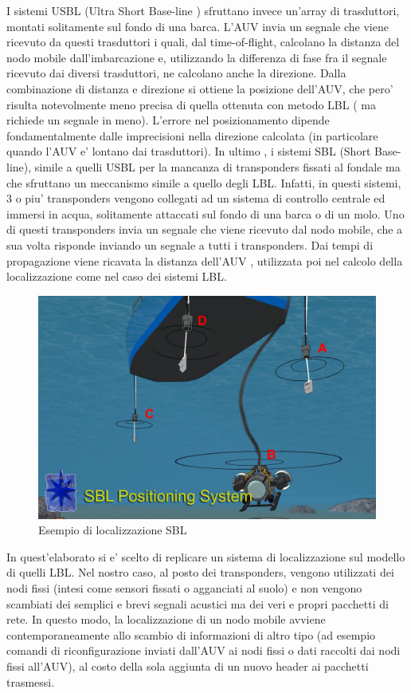 \documentclass[Lau,binding=0.6cm]{sapthesis}
\begin{document}
I sistemi USBL (Ultra Short Base-line ) sfruttano invece un'array di trasduttori, montati solitamente sul fondo di una barca. L'AUV invia un segnale che viene ricevuto da questi trasduttori i quali, dal time-of-flight, calcolano la distanza del nodo mobile dall'imbarcazione e, utilizzando la differenza di fase fra il segnale ricevuto dai diversi trasduttori, ne calcolano anche la direzione. Dalla combinazione di distanza e direzione si ottiene la posizione dell'AUV, che pero' risulta notevolmente meno precisa di quella ottenuta con metodo LBL ( ma richiede un segnale in meno). L'errore nel posizionamento dipende fondamentalmente dalle imprecisioni nella direzione calcolata (in particolare quando l'AUV e' lontano dai trasduttori).\newline
In ultimo , i sistemi SBL (Short Base-line), simile a quelli USBL per la mancanza di transponders fissati al fondale ma che sfruttano un meccanismo simile a quello degli LBL. Infatti, in questi sistemi, 3 o piu' transponders vengono collegati ad un sistema di controllo centrale ed immersi in acqua, solitamente attaccati sul fondo di una barca o di un molo. Uno di questi transponders invia un segnale che viene ricevuto dal nodo mobile, che a sua volta risponde inviando un segnale a tutti i transponders. Dai tempi di propagazione viene ricavata la distanza dell'AUV , utilizzata poi nel calcolo della localizzazione come nel caso dei sistemi LBL.

\begin{figure}[H]
	\centering
	\includegraphics[scale=0.25]{SBL.jpg}
	\caption{ Esempio di localizzazione SBL}
	\label{fig:SBL}
\end{figure}


\par
In quest'elaborato si e' scelto di replicare un sistema di localizzazione sul modello di quelli LBL. Nel nostro caso, al posto dei transponders, vengono utilizzati dei nodi fissi (intesi come sensori fissati o agganciati al suolo) e non vengono scambiati dei semplici e brevi segnali acustici ma dei veri e propri pacchetti di rete. In questo modo, la localizzazione di un nodo mobile avviene contemporaneamente allo scambio di informazioni di altro tipo (ad esempio comandi di riconfigurazione inviati dall'AUV ai nodi fissi o dati raccolti dai nodi fissi all'AUV), al costo della sola aggiunta di un nuovo header ai pacchetti trasmessi.  
\end{document}
